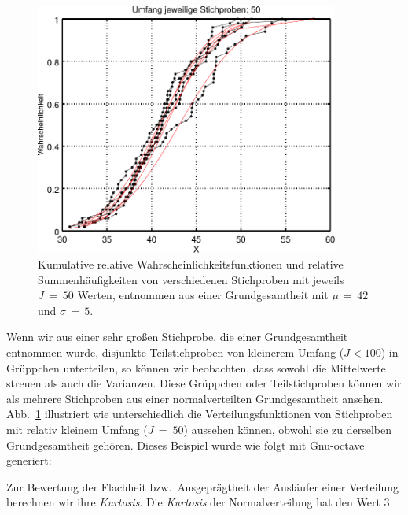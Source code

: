 \begin{figure}
\begin{center}
\includegraphics[width=100mm]{05_vorlesung/media/learn_Student_t1samples.pdf}
\caption{\label{kumulWahrsch} Kumulative relative Wahrscheinlichkeitsfunktionen und relative
Summenhäufigkeiten von verschiedenen Stichproben mit jeweils $J \, = \ 50$ Werten, entnommen aus einer
Grundgesamtheit mit $\mu \, = \, 42$ und $\sigma \, = \, 5$.}
\end{center}
\end{figure}
Wenn wir aus einer sehr großen Stichprobe, die einer Grundgesamtheit entnommen wurde,
disjunkte Teilstichproben von kleinerem Umfang ($J < 100$) in Grüppchen unterteilen, so können wir
beobachten, dass sowohl die Mittelwerte streuen als auch die Varianzen.
Diese Grüppchen oder Teilstichproben können wir als mehrere Stichproben aus einer normalverteilten
Grundgesamtheit ansehen. 
Abb.~\ref{kumulWahrsch} illustriert wie unterschiedlich die Verteilungsfunktionen von
Stichproben mit relativ kleinem Umfang ($J \, = \ 50$) aussehen können, obwohl sie zu derselben
Grundgesamtheit gehören. Dieses Beispiel wurde wie folgt mit Gnu-octave generiert:



Zur Bewertung der Flachheit bzw.\ Ausgeprägtheit der Ausläufer einer Verteilung berechnen wir
ihre \textsl{Kurtosis}. Die \textsl{Kurtosis} der Normalverteilung hat den Wert $3$. 

